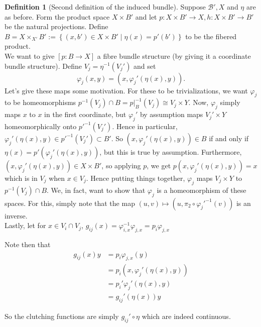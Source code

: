 \documentclass[reqno]{amsart}
\theoremstyle{definition}
\newtheorem{definition}[theorem]{Definition}
\theoremstyle{remark}
\begin{document}
    \begin{definition}[Second definition of the induced bundle]
        Suppose $\mathcal{B}', X$ and $\eta$ are
        as before. Form the product space
        $X \times B'$ and let
        $p \colon X \times B' \to X, h\colon
        X \times B' \to B'$ be the natural projections.
        Define $B = X \times_{X'} B' :=
        \left\{ (x,b') \in X \times B'  \mid 
        \eta (x) = p'(b') \right\} $ to be the
        fibered product.\\
        We want to give
        $\left[ p \colon B \to X \right] $ a fibre
        bundle structure (by giving it a coordinate bundle structure).
        Define
        $V_j = \eta^{-1} (V_j')$ and
        set
         \[
        \varphi_j(x,y) = \left( x, 
        \varphi_j'\left( \eta(x),y \right) \right).
        \] 
        Let's give these maps some motivation.
        For these to be trivializations,
        we want
        $\varphi_j$ to be homeomorphisms
        $p^{-1}(V_j) \cap B = p|_B^{-1}\left( V_j \right) 
        \cong V_j \times Y$.
        Now,  $\varphi_j$ simply maps
        $x$ to $x$ in the first coordinate, but
        $\varphi_j'$ by assumption maps
        $V_j' \times Y$ homeomorphically onto
        $p'^{-1}(V_j')$. Hence in particular,
        $\varphi_j'\left( \eta(x), y \right) 
        \in p'^{-1}(V_j') \subset B'$. So
        $\left( x, \varphi_j' \left( \eta(x), y \right)  \right) 
        \in B$ if and only if
        $\eta (x) = p' \left( 
        \varphi_j' \left( \eta(x), y \right) \right) $, but
        this is true by assumption.
        Furthermore,
        $\left( x, \varphi_j' \left( \eta(x),y \right)  \right) 
        \in X \times B'$, so applying $p$, we get
        $p \left( x, \varphi_j' \left( \eta(x),y \right)  \right) 
        = x$ which is in
        $V_j$ when $x \in V_j$.
        Hence putting things together,
        $\varphi_j$ maps
        $V_j \times Y$ to
        $p^{-1}\left( V_j \right) \cap B$.
        We, in fact, want to show that 
        $\varphi_j$ is a homeomorphism
        of these spaces. For this, simply note that
        the map
        $\left( u,v \right) \mapsto 
         \left( u, \pi_2 \circ \varphi_j'^{-1}(v) \right) $ 
         is an inverse.\\
         Lastly, let for
         $x \in V_i \cap V_j$,
         $g_{ij}(x) = \varphi_{i,x}^{-1} \varphi_{j,x}
         = p_i \varphi_{j,x}$


         Note then that
         \begin{align*}
             g_{ij}(x) y
             &= p_i \varphi_{j,x}(y)\\
             &= p_i \left( x, \varphi_j' \left( 
             \eta (x), y\right)  \right) \\
             &= p_i' \varphi_j' \left( \eta(x), y \right) \\
             &= g_{ij}' \left( \eta(x) \right) y
         \end{align*}
 
         So the clutching functions
         are simply
         $g_{ij}' \circ \eta$ which are indeed
         continuous.

    \end{definition}
\end{document}
